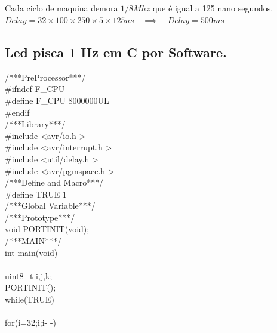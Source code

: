 \documentclass[titlepage, a4paper, 10pt, reqno, openany]{report}
\begin{document}
\\
\\
\\
\\
Cada ciclo de maquina demora $1/8 Mhz$ que \'{e} igual a 125 nano segundos. \\
$Delay=32 \times 100 \times 250 \times 5 \times 125 ns \quad \implies \quad Delay=500ms$ \\

	\subsection {Led pisca 1 Hz em C por Software.}	
\begin{minipage}[T]{.3\linewidth}
/***PreProcessor***/ \\
\#ifndef F\_CPU \\
\hspace*{.5cm}	\#define F\_CPU 8000000UL \\
\#endif \\
/***Library***/ \\
\#include \textless avr/io.h \textgreater \\
\#include \textless avr/interrupt.h \textgreater \\
\#include \textless util/delay.h \textgreater \\
\#include \textless avr/pgmspace.h \textgreater \\
/***Define and Macro***/ \\
\#define TRUE 1 \\
/***Global Variable***/ \\
/***Prototype***/ \\
void PORTINIT(void); \\
/***MAIN***/ \\
int main(void) \\
\textbraceleft \\
\hspace*{.5cm}	uint8\_t i,j,k; \\
\hspace*{.5cm}	PORTINIT(); \\
\hspace*{.5cm}    while(TRUE) \\
\hspace*{.5cm}    \textbraceleft \\
\hspace*{1cm}		for(i=32;i;i- -)\textbraceleft \\

\end{minipage}
\end{document}
